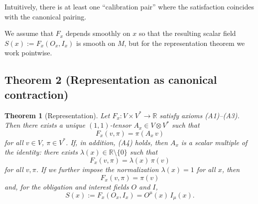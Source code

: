 \documentclass[12pt]{article}
\newtheorem{theorem}{Theorem}
\theoremstyle{remark}
\begin{document}
Intuitively, there is at least one ``calibration pair'' where the satisfaction coincides with the canonical pairing.

We assume that $F_x$ depends smoothly on $x$ so that the resulting scalar field $S(x) := F_x(O_x, I_x)$ is smooth on $M$, but for the representation theorem we work pointwise.

\subsection{Theorem 2 (Representation as canonical contraction)}

\begin{theorem}[Representation]
Let $F_x\colon V \times V^* \to \mathbb{R}$ satisfy axioms \emph{(A1)--(A3)}. Then there exists a unique $(1,1)$-tensor $A_x \in V \otimes V^*$ such that
\begin{equation}
    F_x(v, \pi) = \pi(A_x\, v)
\end{equation}
for all $v \in V$, $\pi \in V^*$. If, in addition, \emph{(A4)} holds, then $A_x$ is a scalar multiple of the identity: there exists $\lambda(x) \in \mathbb{R} \setminus \{0\}$ such that
\begin{equation}
    F_x(v, \pi) = \lambda(x)\, \pi(v)
\end{equation}
for all $v, \pi$. If we further impose the normalization $\lambda(x) = 1$ for all $x$, then
\begin{equation}
    F_x(v, \pi) = \pi(v)
\end{equation}
and, for the obligation and interest fields $O$ and $I$,
\begin{equation}
    S(x) := F_x(O_x, I_x) = O^\mu(x)\, I_\mu(x).
\end{equation}
\end{theorem}
\end{document}
